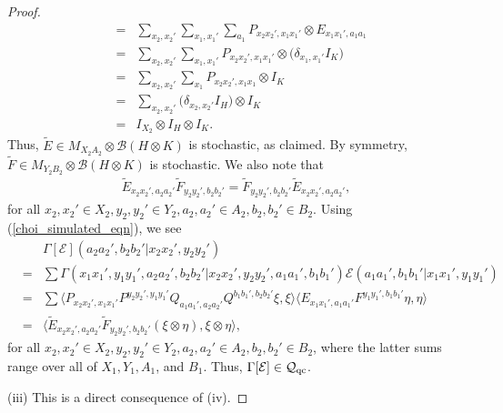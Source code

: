 \documentclass[11pt]{amsart}
\newcommand{\cl}[1]{\mathcal{#1}}
\begin{document}
\begin{proof}
\begin{eqnarray*}
& = &
\sum\limits_{x_{2}, x_{2}'}\sum\limits_{x_{1}, x_{1}'}\sum\limits_{a_{1}}P_{x_{2}x_{2}', x_{1}x_{1}'}\otimes E_{x_{1}x_{1}', a_{1}a_{1}} \\
& = &
\sum\limits_{x_{2}, x_{2}'}\sum\limits_{x_{1}, x_{1}'}P_{x_{2}x_{2}', x_{1}x_{1}'}\otimes \big(\delta_{x_{1}, x_{1}'}I_{K}) \\
& = &
\sum\limits_{x_{2}, x_{2}'}\sum\limits_{x_{1}}P_{x_{2}x_{2}', x_{1}x_{1}}\otimes I_{K} \\
& = &
\sum\limits_{x_{2}, x_{2}'}\big(\delta_{x_{2}, x_{2}'}I_{H}\big)\otimes I_{K} \\
& = &
I_{X_{2}}\otimes I_{H}\otimes I_{K}.
\end{eqnarray*}
\noindent Thus, $\tilde{E} \in M_{X_{2}A_{2}}\otimes \cl{B}(H\otimes K)$ is stochastic, as claimed. By symmetry, $\tilde{F} \in M_{Y_{2}B_{2}}\otimes \cl{B}(H\otimes K)$ is stochastic. We also note that
\begin{gather*}
	\tilde{E}_{x_{2}x_{2}', a_{2}a_{2}'}\tilde{F}_{y_{2}y_{2}', b_{2}b_{2}'} = \tilde{F}_{y_{2}y_{2}', b_{2}b_{2}'}\tilde{E}_{x_{2}x_{2}', a_{2}a_{2}'},
\end{gather*}
\noindent for all $x_{2}, x_{2}' \in X_{2}, y_{2}, y_{2}' \in Y_{2}, a_{2}, a_{2}' \in A_{2}, b_{2}, b_{2}' \in B_{2}$. Using (\ref{choi_simulated_eqn}), we see
\begin{eqnarray*}
& &
	\Gamma[\cl{E}](a_{2}a_{2}', b_{2}b_{2}'|x_{2}x_{2}', y_{2}y_{2}') \\
& = &
	\sum\Gamma(x_{1}x_{1}', y_{1}y_{1}', a_{2}a_{2}', b_{2}b_{2}'|x_{2}x_{2}', y_{2}y_{2}', a_{1}a_{1}', b_{1}b_{1}')\cl{E}(a_{1}a_{1}', b_{1}b_{1}'|x_{1}x_{1}', y_{1}y_{1}') \\
& = &
	\sum\langle P_{x_{2}x_{2}', x_{1}x_{1}'}P^{y_{2}y_{2}', y_{1}y_{1}'}Q_{a_{1}a_{1}', a_{2}a_{2}'}Q^{b_{1}b_{1}', b_{2}b_{2}'}\xi, \xi\rangle\langle E_{x_{1}x_{1}', a_{1}a_{1}'}F^{y_{1}y_{1}', b_{1}b_{1}'}\eta, \eta\rangle \\
& = &
	\big\langle \tilde{E}_{x_{2}x_{2}', a_{2}a_{2}'}\tilde{F}_{y_{2}y_{2}', b_{2}b_{2}'}(\xi\otimes \eta), \xi\otimes \eta\big\rangle,
\end{eqnarray*}
\noindent for all $x_{2}, x_{2}' \in X_{2}, y_{2}, y_{2}' \in Y_{2}, a_{2}, a_{2}' \in A_{2}, b_{2}, b_{2}' \in B_{2}$, where the latter sums range over all of $X_{1}, Y_{1}, A_{1}$, and $B_{1}$. Thus, $\Gamma[\cl{E}] \in \cl{Q}_{\rm qc}$.

(iii) This is a direct consequence of (iv).


\end{proof}
\end{document}
